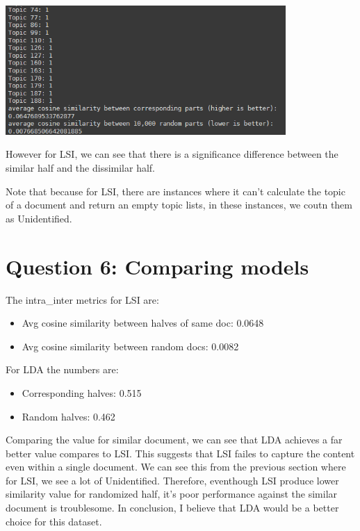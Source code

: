 \documentclass[a4paper]{article}
\begin{document}
\includegraphics[width=0.8\textwidth]{../images/LSI - 4.png}

However for LSI, we can see that there is a significance difference between the
similar half and the dissimilar half.

Note that because for LSI, there are instances where it can't calculate the
topic of a document and return an empty topic lists, in these instances, we
coutn them as Unidentified.

\section{Question 6: Comparing models}
The intra\_inter metrics for LSI are:
\begin{itemize}
	\item Avg cosine similarity between halves of same doc: 0.0648
	\item Avg cosine similarity between random docs: 0.0082
\end{itemize}

For LDA the numbers are:
\begin{itemize}
	\item Corresponding halves: 0.515
	\item Random halves: 0.462
\end{itemize}

Comparing the value for similar document, we can see that LDA achieves a far
better value compares to LSI. This suggests that LSI failes to capture the
content even within a single document. We can see this from the previous section
where for LSI, we see a lot of Unidentified. Therefore, eventhough LSI produce
lower similarity value for randomized half, it's poor performance against the
similar document is troublesome. In conclusion, I believe that LDA would be a
better choice for this dataset.
\end{document}
